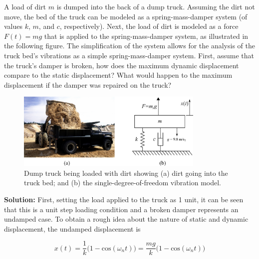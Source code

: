 \documentclass[12pt,letter]{article}
\begin{document}
\begin{example}
A load of dirt $m$ is dumped into the back of a dump truck. Assuming the dirt not move, the bed of the truck can be modeled as a spring-mass-damper system (of values $k$, $m$, and $c$, respectively). Next, the load of dirt is modeled as a force $F(t) = m g$ that is applied to the spring-mass-damper system, as illustrated in the following figure. The simplification of the system allows for the analysis of the truck bed's vibrations as a simple spring-mass-damper system. First, assume that the truck's damper is broken, how does the maximum dynamic displacement compare to the static displacement? What would happen to the maximum displacement if the damper was repaired on the truck? %

\begin{figure}[H]
	\centering
	\includegraphics[width=0.8\textwidth]{../figures/dump_truck_example}
	\caption{Dump truck being loaded with dirt showing (a) dirt going into the truck bed\protect\footnotemark[1]; and (b) the single-degree-of-freedom vibration model.  }
\end{figure}

\noindent\textbf{Solution:} First, setting the load applied to the truck as 1 unit, it can be seen that this is a unit step loading condition and a broken damper represents an undamped case. To obtain a rough idea about the nature of static and dynamic displacement, the undamped displacement is

\begin{equation}
	x(t) = \frac{1}{k}\big(1-\text{cos}(\omega_n t)\big) = \frac{m g}{k}\big(1-\text{cos}(\omega_n t)\big)
\end{equation}
 

\end{example}
\end{document}
